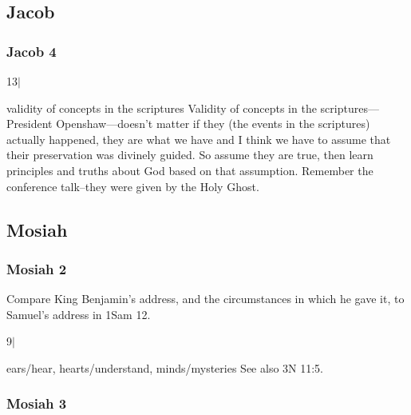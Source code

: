 \subsection{Jacob} %

	\subsubsection{Jacob 4} %

		\begin{compactdesc}

		\item[13$\vert$]
		\begin{compactdesc}
		\item[validity of concepts in the scriptures] Validity of concepts in the scriptures---President Openshaw---doesn't matter if they (the events in the scriptures) actually happened, they are what we have and I think we have to assume that their preservation was divinely guided. So assume they are true, then learn principles and truths about God based on that assumption. Remember the conference talk--they were given by the Holy Ghost.
		\end{compactdesc}

		\end{compactdesc}

\subsection{Mosiah} %

	\subsubsection{Mosiah 2} %

		Compare King Benjamin's address, and the circumstances in which he gave it, to Samuel's address in 1Sam 12.
		
		\begin{compactdesc}
		
		\item[9$\vert$]
		\begin{compactdesc}
		\item[ears/hear, hearts/understand, minds/mysteries] See also 3N 11:5.
		\end{compactdesc}
		
		\end{compactdesc}

	\subsubsection{Mosiah 3} %

